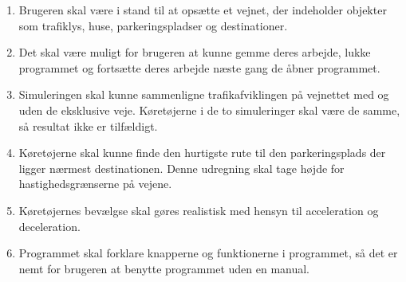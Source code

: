 \begin{enumerate}
\item Brugeren skal være i stand til at opsætte et vejnet, der indeholder objekter som trafiklys, huse, parkeringspladser og destinationer.
\item Det skal være muligt for brugeren at kunne gemme deres arbejde, lukke programmet og fortsætte deres arbejde næste gang de åbner programmet.
\item Simuleringen skal kunne sammenligne trafikafviklingen på vejnettet med og uden de eksklusive veje. Køretøjerne i de to simuleringer skal være de samme, så resultat ikke er tilfældigt.
\item Køretøjerne skal kunne finde den hurtigste rute til den parkeringsplads der ligger nærmest destinationen. Denne udregning skal tage højde for hastighedsgrænserne på vejene.
\item Køretøjernes bevælgse skal gøres realistisk med hensyn til acceleration og deceleration.
\item Programmet skal forklare knapperne og funktionerne i programmet, så det er nemt for brugeren at benytte programmet uden en manual.
\end{enumerate}